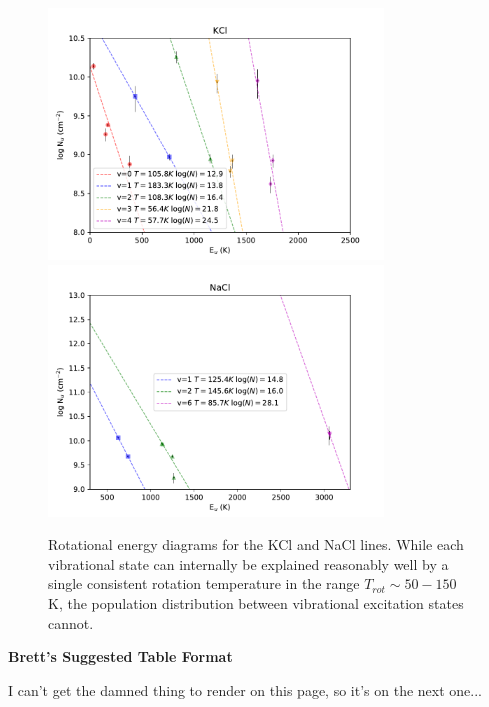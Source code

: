 \documentclass[twocolumn]{aastex62}
\begin{document}
\begin{figure}[!htp]
\includegraphics[scale=1,width=3.5in]{figures/KCl_rotational_diagrams.pdf}
\includegraphics[scale=1,width=3.5in]{figures/NaCl_rotational_diagrams.pdf}
\caption{Rotational energy diagrams for the KCl and NaCl lines.  While each
vibrational state can internally be explained reasonably well by a single
consistent rotation temperature in the range $T_{rot}\sim50-150$ K, the population
distribution between vibrational excitation states cannot.}
\label{fig:rotationdiagrams}
\end{figure}









\clearpage

\begin{center}
    \textbf{Brett's Suggested Table Format}
\end{center}

I can't get the damned thing to render on this page, so it's on the next one...
\end{document}
